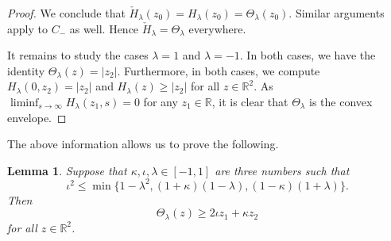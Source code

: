 \documentclass[a4paper]{article}
\newcommand{\R}{\mathbb{R}}
\newtheorem{lemma}[theorem]{Lemma}
\theoremstyle{definition}
\theoremstyle{remark}
\begin{document}
\begin{proof}
We conclude that $\check{H}_\lambda(z_0) = H_\lambda(z_0) = \Theta_\lambda(z_0)$.
Similar arguments apply to $C_-$ as well. Hence
$\check{H}_\lambda = \Theta_\lambda$ everywhere.

It remains to study the cases $\lambda = 1$ and $\lambda = - 1$. In both
cases, we have the identity $\Theta_\lambda(z) = |z_2|$. Furthermore, in both
cases, we compute $H_\lambda(0, z_2) = |z_2|$ and $H_\lambda(z) \ge |z_2|$
for all $z \in \R^2$. As $\liminf_{s \to \infty} H_\lambda(z_1, s) = 0$ for any
$z_1 \in \R$, it is clear that $\Theta_\lambda$ is the convex envelope.
\end{proof}

The above information allows us to prove the following.

\begin{lemma} \label{lem:subdifferential}
Suppose that $\kappa, \iota, \lambda \in [-1, 1]$ are three numbers such
that
\[
\iota^2 \le \min\{1 - \lambda^2, (1 + \kappa)(1 - \lambda), (1 - \kappa)(1 + \lambda)\}.
\]
Then
\[
\Theta_\lambda(z) \ge 2\iota z_1 + \kappa z_2
\]
for all $z \in \R^2$.
\end{lemma}
\end{document}
